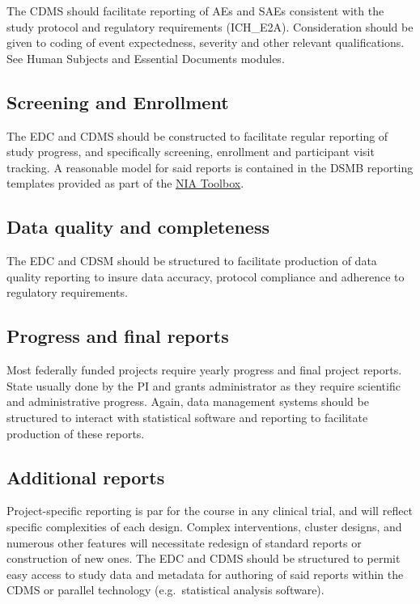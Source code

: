 \documentclass[]{book}
\theoremstyle{definition}
\theoremstyle{definition}
\theoremstyle{definition}
\theoremstyle{remark}
\begin{document}
The CDMS should facilitate reporting of AEs and SAEs consistent with the
study protocol and regulatory requirements (ICH\_E2A). Consideration
should be given to coding of event expectedness, severity and other
relevant qualifications. See Human Subjects and Essential Documents
modules.

\subsection{Screening and Enrollment}\label{screening-and-enrollment}

The EDC and CDMS should be constructed to facilitate regular reporting
of study progress, and specifically screening, enrollment and
participant visit tracking. A reasonable model for said reports is
contained in the DSMB reporting templates provided as part of the
\href{https://www.nia.nih.gov/research/dgcg/clinical-research-study-investigators-toolbox/startup}{NIA
Toolbox}.

\subsection{Data quality and
completeness}\label{data-quality-and-completeness}

The EDC and CDSM should be structured to facilitate production of data
quality reporting to insure data accuracy, protocol compliance and
adherence to regulatory requirements.

\subsection{Progress and final
reports}\label{progress-and-final-reports}

Most federally funded projects require yearly progress and final project
reports. State usually done by the PI and grants administrator as they
require scientific and administrative progress. Again, data management
systems should be structured to interact with statistical software and
reporting to facilitate production of these reports.

\subsection{Additional reports}\label{additional-reports}

Project-specific reporting is par for the course in any clinical trial,
and will reflect specific complexities of each design. Complex
interventions, cluster designs, and numerous other features will
necessitate redesign of standard reports or construction of new ones.
The EDC and CDMS should be structured to permit easy access to study
data and metadata for authoring of said reports within the CDMS or
parallel technology (e.g.~statistical analysis software).
\end{document}
